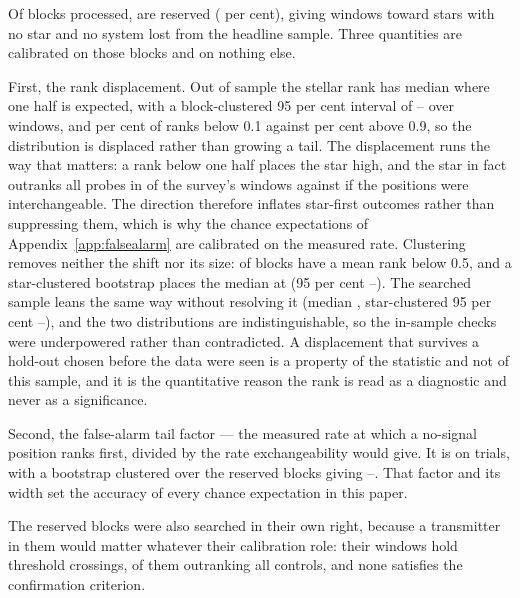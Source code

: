 Of \NEbProcessedAll{} blocks processed, \NEbHeldOut{} are reserved
(\HoPctHeld{} per cent), giving \HoWin{} windows toward \HoStars{} stars with
no star and no system lost from the headline sample. Three quantities are
calibrated on those blocks and on nothing else.

First, the rank displacement. Out of sample the stellar rank has median
\HoRankMed{} where one half is expected, with a block-clustered 95 per cent
interval of \HoRankMedLo--\HoRankMedHi{} over \HoWin{} windows, and
\HOFracLoPct{} per cent of ranks below 0.1 against \HOFracHiPct{} per cent
above 0.9, so the distribution is displaced rather than growing a tail. The
displacement runs the way that matters: a rank below one half places the star
high, and the star in fact outranks all \NCtrl{} probes in \NsrFirstObs{} of
the survey's windows against \NsrFirstExp{} if the positions were
interchangeable. The direction therefore inflates star-first outcomes rather
than suppressing them, which is why the chance expectations of
Appendix~\ref{app:falsealarm} are calibrated on the measured rate.
Clustering removes neither the shift nor its size: \HOBlockBelow{} of
\HOBlockN{} blocks have a mean rank below 0.5, and a star-clustered bootstrap
places the median at \HOBootMed{} (95 per cent \HOBootLo--\HOBootHi). The
searched sample leans the same way without resolving it (median \SurvMedP,
star-clustered 95 per cent \SurvBootLo--\SurvBootHi), and the two
distributions are indistinguishable, so the in-sample checks were
underpowered rather than contradicted. A displacement that survives a
hold-out chosen before the data were seen is a property of the statistic and
not of this sample, and it is the quantitative reason the rank is read as a
diagnostic and never as a significance.

Second, the false-alarm tail factor --- the measured rate at which a
no-signal position ranks first, divided by the rate exchangeability would
give. It is \HoTailFactor{} on \HoPseudoTrials{} trials, with a bootstrap
clustered over the \HoTailBlocks{} reserved blocks giving
\HoTailLo--\HoTailHi. That factor and its width set the accuracy of every
chance expectation in this paper.

The reserved blocks were also searched in their own right, because a
transmitter in them would matter whatever their calibration role: their
\ChnHoWin{} windows hold \ChnHoCross{} threshold crossings, \ChnHoFirst{} of
them outranking all \NCtrl{} controls, and none satisfies the confirmation
criterion.

